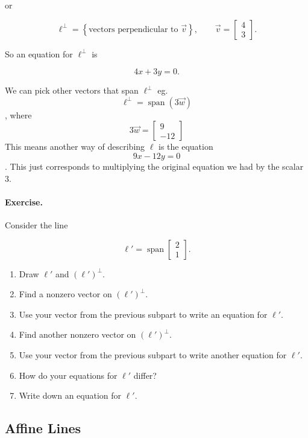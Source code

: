 or

$$
\ell^\perp
=
\left\{
\text{vectors perpendicular to } \vec v
\right\},
\qquad
\vec v=
\begin{bmatrix}
4\\
3
\end{bmatrix}.
$$

So an equation for $\ell^\perp$ is

$$
4x+3y=0.
$$

\begin{remark}
    We can pick other vectors that span $\ell^\perp$ eg. 
    $$
    \ell^\perp = \operatorname{span} (3\vec{w})$$,
    where 
    $$ 3\vec{w} =\begin{bmatrix}
9\\
-12
\end{bmatrix} $$
This means another way of describing
$\ell$ is the equation
$$ 9x - 12y=0$$.
This just corresponds to multiplying the original equation we had by the scalar $3$.
\end{remark}

\paragraph{Exercise.}
Consider the line

$$
\ell'=\operatorname{span}
\begin{bmatrix}
2\\
1
\end{bmatrix}.
$$

\begin{enumerate}
  \item Draw $\ell'$ and $(\ell')^\perp$.
  \item Find a nonzero vector on $(\ell')^\perp$.
  \item Use your vector from the previous subpart to write an equation for $\ell'$.
  \item Find another nonzero vector on $(\ell')^\perp$.
  \item Use your vector from the previous subpart to write another equation for $\ell'$.
  \item How do your equations for $\ell'$ differ?
  \item Write down an equation for $\ell'$.
\end{enumerate}

\subsection{Affine Lines}

